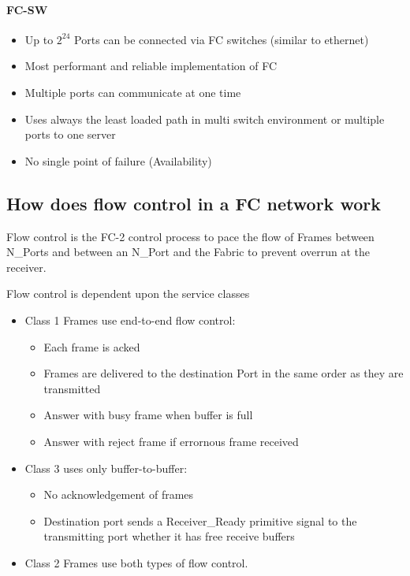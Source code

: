 \documentclass{article}
\begin{document}
\paragraph{FC-SW}
\begin{itemize}
	\item Up to $2^{24}$ Ports can be connected via FC switches (similar to ethernet)
	\item Most performant and reliable implementation of FC
	\item Multiple ports can communicate at one time
	\item Uses always the least loaded path in multi switch environment or multiple ports to one server
	\item No single point of failure (Availability)
\end{itemize}


\newpage
\subsection{How does flow control in a FC network work}
Flow control is the FC-2 control process to pace the flow of Frames between N\_Ports and between an N\_Port and the Fabric to prevent overrun at the receiver. 


Flow control is dependent upon the service classes  

\begin{itemize}
	\item Class 1 Frames use end-to-end flow control: 
		\begin{itemize}
			\item Each frame is acked
			\item Frames are delivered to the destination Port in the same order as they are transmitted
			\item Answer with busy frame when buffer is full
			\item Answer with reject frame if errornous frame received
		\end{itemize}
	\item Class 3 uses only buffer-to-buffer: 
		\begin{itemize}
			\item No acknowledgement of frames 
			\item Destination port sends a Receiver\_Ready primitive signal to the transmitting port whether it has free receive buffers
		\end{itemize}
	\item Class 2 Frames use both types of flow control.
\end{itemize}
\end{document}
